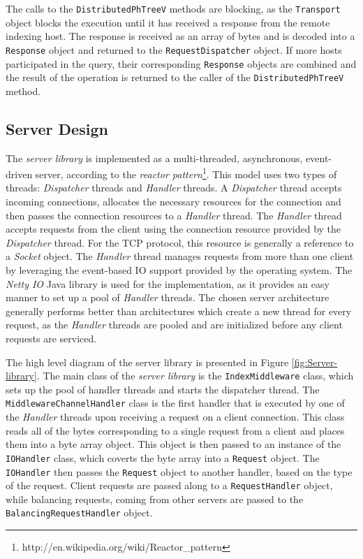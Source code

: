 \documentclass[11pt,a4paper]{globis-book}
\begin{document}
The calls to the \texttt{DistributedPhTreeV} methods are blocking, as the \texttt{Transport} object blocks the execution until it has received a response from the remote indexing host. The response is received as an array of bytes and is decoded into a \texttt{Response} object and returned to the \texttt{RequestDispatcher} object. If more hosts participated in the query, their corresponding \texttt{Response} objects are combined and the result of the operation is returned to the caller of the \texttt{DistributedPhTreeV} method. 

\subsection{Server Design}

The \textit{server library} is implemented as a multi-threaded, asynchronous, event-driven server, according to the \textit{reactor pattern}\footnote{http://en.wikipedia.org/wiki/Reactor\_pattern}. This model uses two types of threads: \textit{Dispatcher} threads and \textit{Handler} threads. A \textit{Dispatcher} thread accepts incoming connections, allocates the necessary resources for the connection and then passes the connection resources to a \textit{Handler} thread. The \textit{Handler} thread accepts requests from the client using the connection resource provided by the \textit{Dispatcher} thread. For the TCP protocol, this resource is generally a reference to a \textit{Socket} object. The \textit{Handler} thread manages requests from more than one client by leveraging the event-based IO support provided by the operating system. The \textit{Netty IO} Java library is used for the implementation, as it provides an easy manner to set up a pool of \textit{Handler} threads. The chosen server architecture generally performs better than architectures which create a new thread for every request, as the \textit{Handler} threads are pooled and are initialized before any client requests are serviced. 

The high level diagram of the server library is presented in Figure \ref{fig:Server-library}. The main class of the \textit{server library} is the \texttt{IndexMiddleware} class, which sets up the pool of handler threads and starts the dispatcher thread. The \texttt{MiddlewareChannelHandler} class is the first handler that is executed by one of the \textit{Handler} threads upon receiving a request on a client connection. This class reads all of the bytes corresponding to a single request from a client and places them into a byte array object. This object is then passed to an instance of the \texttt{IOHandler} class, which coverts the byte array into a \texttt{Request} object. The \texttt{IOHandler} then passes the \texttt{Request} object to another handler, based on the type of the request. Client requests are passed along to a \texttt{RequestHandler} object, while balancing requests, coming from other servers are passed to the \texttt{BalancingRequestHandler} object. 
\end{document}

